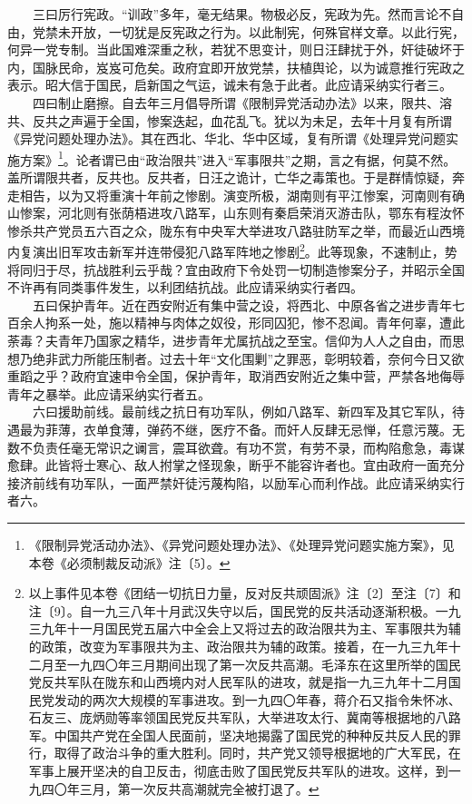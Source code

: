\documentclass[cn,11pt,chinese]{elegantbook}
\begin{document}
　　三曰厉行宪政。“训政”多年，毫无结果。物极必反，宪政为先。然而言论不自由，党禁未开放，一切犹是反宪政之行为。以此制宪，何殊官样文章。以此行宪，何异一党专制。当此国难深重之秋，若犹不思变计，则日汪肆扰于外，奸徒破坏于内，国脉民命，岌岌可危矣。政府宜即开放党禁，扶植舆论，以为诚意推行宪政之表示。昭大信于国民，启新国之气运，诚未有急于此者。此应请采纳实行者三。\\
　　四曰制止磨擦。自去年三月倡导所谓《限制异党活动办法》以来，限共、溶共、反共之声遍于全国，惨案迭起，血花乱飞。犹以为未足，去年十月复有所谓《异党问题处理办法》。其在西北、华北、华中区域，复有所谓《处理异党问题实施方案》\footnote[4]{ 《限制异党活动办法》、《异党问题处理办法》、《处理异党问题实施方案》，见本卷《必须制裁反动派》注〔5〕。}。论者谓已由“政治限共”进入“军事限共”之期，言之有据，何莫不然。盖所谓限共者，反共也。反共者，日汪之诡计，亡华之毒策也。于是群情惊疑，奔走相告，以为又将重演十年前之惨剧。演变所极，湖南则有平江惨案，河南则有确山惨案，河北则有张荫梧进攻八路军，山东则有秦启荣消灭游击队，鄂东有程汝怀惨杀共产党员五六百之众，陇东有中央军大举进攻八路驻防军之举，而最近山西境内复演出旧军攻击新军并连带侵犯八路军阵地之惨剧\footnote[5]{ 以上事件见本卷《团结一切抗日力量，反对反共顽固派》注〔2〕至注〔7〕和注〔9〕。自一九三八年十月武汉失守以后，国民党的反共活动逐渐积极。一九三九年十一月国民党五届六中全会上又将过去的政治限共为主、军事限共为辅的政策，改变为军事限共为主、政治限共为辅的政策。接着，在一九三九年十二月至一九四〇年三月期间出现了第一次反共高潮。毛泽东在这里所举的国民党反共军队在陇东和山西境内对人民军队的进攻，就是指一九三九年十二月国民党发动的两次大规模的军事进攻。到一九四〇年春，蒋介石又指令朱怀冰、石友三、庞炳勋等率领国民党反共军队，大举进攻太行、冀南等根据地的八路军。中国共产党在全国人民面前，坚决地揭露了国民党的种种反共反人民的罪行，取得了政治斗争的重大胜利。同时，共产党又领导根据地的广大军民，在军事上展开坚决的自卫反击，彻底击败了国民党反共军队的进攻。这样，到一九四〇年三月，第一次反共高潮就完全被打退了。}。此等现象，不速制止，势将同归于尽，抗战胜利云乎哉？宜由政府下令处罚一切制造惨案分子，并昭示全国不许再有同类事件发生，以利团结抗战。此应请采纳实行者四。\\
　　五曰保护青年。近在西安附近有集中营之设，将西北、中原各省之进步青年七百余人拘系一处，施以精神与肉体之奴役，形同囚犯，惨不忍闻。青年何辜，遭此荼毒？夫青年乃国家之精华，进步青年尤属抗战之至宝。信仰为人人之自由，而思想乃绝非武力所能压制者。过去十年“文化围剿”之罪恶，彰明较着，奈何今日又欲重蹈之乎？政府宜速申令全国，保护青年，取消西安附近之集中营，严禁各地侮辱青年之暴举。此应请采纳实行者五。\\
　　六曰援助前线。最前线之抗日有功军队，例如八路军、新四军及其它军队，待遇最为菲薄，衣单食薄，弹药不继，医疗不备。而奸人反肆无忌惮，任意污蔑。无数不负责任毫无常识之谰言，震耳欲聋。有功不赏，有劳不录，而构陷愈急，毒谋愈肆。此皆将士寒心、敌人拊掌之怪现象，断乎不能容许者也。宜由政府一面充分接济前线有功军队，一面严禁奸徒污蔑构陷，以励军心而利作战。此应请采纳实行者六。\\
\end{document}
